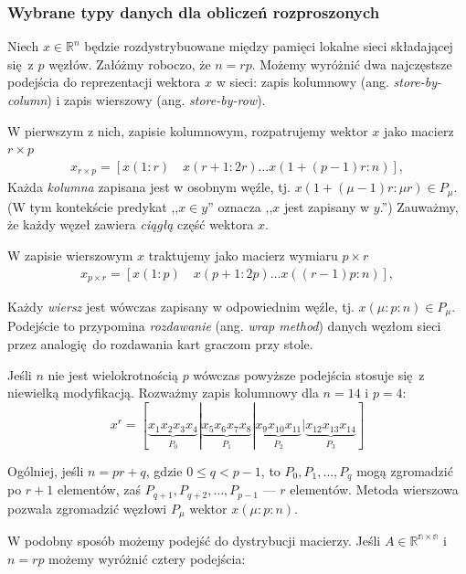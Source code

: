 \subsubsection{Wybrane typy danych dla obliczeń rozproszonych}

Niech \(x\in\mathbb{R}^n\) będzie rozdystrybuowane między pamięci lokalne sieci składającej się z \(p\) węzłów. Załóżmy roboczo, że \(n=rp\). Możemy wyróżnić dwa najczęstsze podejścia do reprezentacji wektora \(x\) w sieci: zapis kolumnowy (ang. \emph{store-by-column}) i zapis wierszowy (ang. \emph{store-by-row}).

W pierwszym z nich, zapisie kolumnowym, rozpatrujemy wektor \(x\) jako macierz \(r\times p\)
\begin{align*}
x_{r\times p} = \left[x(1:r)\quad x(r+1:2r) \dots x(1+(p-1)r:n)\right],
\end{align*}
Każda \emph{kolumna} zapisana jest w osobnym węźle, tj. \( x (1+(\mu-1)r\colon \mu r) \in P_{\mu}\). (W tym kontekście predykat ,,\(x\in y\)'' oznacza ,,\(x\) jest zapisany w \(y\).'') Zauważmy, że każdy węzeł zawiera \emph{ciągłą} część wektora \(x\).


W zapisie wierszowym \(x\) traktujemy jako macierz wymiaru \(p\times r\)
\begin{align*}
x_{p\times r} = \left[x(1:p)\quad x(p+1:2p) \dots x((r-1)p:n)\right],
\end{align*}

Każdy \emph{wiersz} jest wówczas zapisany w odpowiednim węźle, tj. \(x (\mu \colon p \colon n)\in P_{\mu}\). Podejście to przypomina \emph{rozdawanie} (ang. \emph{wrap method}) danych węzłom sieci przez analogię do rozdawania kart graczom przy stole.

Jeśli \(n\) nie jest wielokrotnością \(p\) wówczas powyższe podejścia stosuje się z niewielką modyfikacją. Rozważmy zapis kolumnowy dla \(n=14\) i \(p=4\):
\begin{equation}
x^r=[\underbrace{x_1 x_2 x_3 x_4}_{P_0} | \underbrace{x_5 x_6 x_7 x_8}_{P_1} | \underbrace{x_9 x_{10} x_{11}}_{P_2} | \underbrace{x_{12} x_{13} x_{14}}_{P_3}]
\end{equation} 

Ogólniej, jeśli \(n = pr + q\), gdzie \(0\leq q < p-1\), to \(P_0, P_1, \dots, P_q\) mogą zgromadzić po \(r+1\) elementów, zaś \(P_{q+1}, P_{q+2}, \dots, P_{p-1}\) --- \(r\) elementów. Metoda wierszowa pozwala zgromadzić węzłowi \(P_{\mu}\) wektor \(x(\mu\colon p \colon n)\).

W podobny sposób możemy podejść do dystrybucji macierzy. Jeśli \(A\in\mathbb{R^{n\times n}}\) i \(n = rp\) możemy wyróżnić cztery podejścia:

